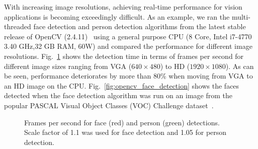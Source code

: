 With increasing image resolutions, achieving real-time performance for vision applications is becoming exceedingly difficult. 
As an example, we ran the multi-threaded face detection and person detection algorithms from the latest stable release of OpenCV (2.4.11)~\cite{OpenCV} using 
a general purpose CPU (8 Core, Intel i7-4770 3.40 GHz,32 GB RAM, 60W) and compared the performance 
for different image resolutions.
Fig.~\ref{fig:face_fps} shows the detection time in terms of frames per second  for different image sizes ranging from VGA ($640\times480$) 
to HD ($1920\times1080$).
As can be seen, performance deteriorates by more than 80\% when moving from VGA to an HD image on the CPU.
Fig.~\ref{fig:opencv_face_detection} shows the faces detected when the face detection algorithm was run on an image 
from the popular PASCAL Visual Object Classes (VOC) Challenge dataset~\cite{Everingham2010}.

\begin{figure}[!htb]
\centering
{}
\caption{Frames per second for face (red) and person (green) detections. Scale factor of 1.1 was used for face detection and 1.05 for person detection.}
\label{fig:face_fps}
\end{figure}

